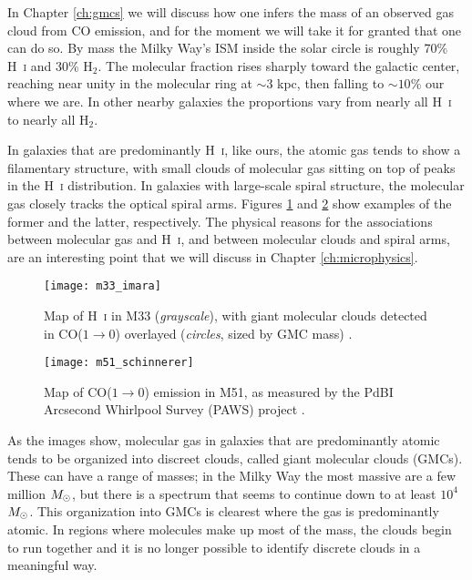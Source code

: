 In Chapter \ref{ch:gmcs} we will discuss how one infers the mass of an observed gas cloud from CO emission, and for the moment we will take it for granted that one can do so. By mass the Milky Way's ISM inside the solar circle is roughly 70\% H~\textsc{i} and 30\% H$_2$. The molecular fraction rises sharply toward the galactic center, reaching near unity in the molecular ring at $\sim 3$ kpc, then falling to $\sim 10\%$ our where we are. In other nearby galaxies the proportions vary from nearly all H~\textsc{i} to nearly all H$_2$.

In galaxies that are predominantly H~\textsc{i}, like ours, the atomic gas tends to show a filamentary structure, with small clouds of molecular gas sitting on top of peaks in the H~\textsc{i} distribution. In galaxies with large-scale spiral structure, the molecular gas closely tracks the optical spiral arms. Figures \ref{fig:m33_imara} and \ref{fig:m51_schinnerer} show examples of the former and the latter, respectively. The physical reasons for the associations between molecular gas and H~\textsc{i}, and between molecular clouds and spiral arms, are an interesting point that we will discuss in Chapter \ref{ch:microphysics}. 

\begin{figure}
\texttt{[image: m33\_imara]}
\caption[Distribution of H~\textsc{i} and GMCs in M33]{
\label{fig:m33_imara}
Map of H~\textsc{i} in M33 (\textit{grayscale}), with giant molecular clouds detected in CO($1\rightarrow 0$) overlayed (\textit{circles}, sized by GMC mass) \citep{imara11b}.
}
\end{figure}

\begin{figure}
\texttt{[image: m51\_schinnerer]}
\caption[Distribution of CO($1\rightarrow 0$) emission in M51]{
\label{fig:m51_schinnerer}
Map of CO($1\rightarrow 0$) emission in M51, as measured by the PdBI Arcsecond Whirlpool Survey (PAWS) project \citep{schinnerer13a}.
}
\end{figure}

As the images show, molecular gas in galaxies that are predominantly atomic tends to be organized into discreet clouds, called giant molecular clouds (GMCs). These can have a range of masses; in the Milky Way the most massive are a few million $M_{\odot}$, but there is a spectrum that seems to continue down to at least $10^4$ $M_{\odot}$. This organization into GMCs is clearest where the gas is predominantly atomic. In regions where molecules make up most of the mass, the clouds begin to run together and it is no longer possible to identify discrete clouds in a meaningful way.

